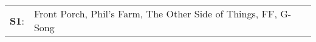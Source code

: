 \begin{supertabular}{p{0.03\textwidth}p{0.92\textwidth}}
 \textbf{S1}:  &  Front Porch\textsuperscript{}, \enspace Phil's Farm\textsuperscript{}, \enspace The Other Side of Things\textsuperscript{}, \enspace FF\textsuperscript{}, \enspace G-Song\textsuperscript{}  \enspace  \\
\end{supertabular}
